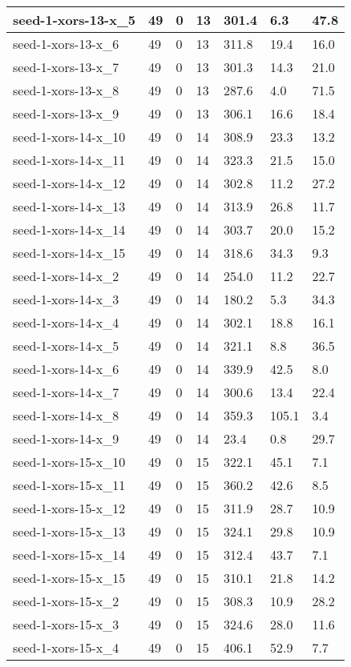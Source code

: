 \begin{scriptsize}
\begin{longtable}{|p{5cm}|l|l|l|l|l|l|}
seed-1-xors-13-x\_5&49&0&13&301.4&6.3&47.8 \\ \hline 
seed-1-xors-13-x\_6&49&0&13&311.8&19.4&16.0 \\ \hline 
seed-1-xors-13-x\_7&49&0&13&301.3&14.3&21.0 \\ \hline 
seed-1-xors-13-x\_8&49&0&13&287.6&4.0&71.5 \\ \hline 
seed-1-xors-13-x\_9&49&0&13&306.1&16.6&18.4 \\ \hline 
seed-1-xors-14-x\_10&49&0&14&308.9&23.3&13.2 \\ \hline 
seed-1-xors-14-x\_11&49&0&14&323.3&21.5&15.0 \\ \hline 
seed-1-xors-14-x\_12&49&0&14&302.8&11.2&27.2 \\ \hline 
seed-1-xors-14-x\_13&49&0&14&313.9&26.8&11.7 \\ \hline 
seed-1-xors-14-x\_14&49&0&14&303.7&20.0&15.2 \\ \hline 
seed-1-xors-14-x\_15&49&0&14&318.6&34.3&9.3 \\ \hline 
seed-1-xors-14-x\_2&49&0&14&254.0&11.2&22.7 \\ \hline 
seed-1-xors-14-x\_3&49&0&14&180.2&5.3&34.3 \\ \hline 
seed-1-xors-14-x\_4&49&0&14&302.1&18.8&16.1 \\ \hline 
seed-1-xors-14-x\_5&49&0&14&321.1&8.8&36.5 \\ \hline 
seed-1-xors-14-x\_6&49&0&14&339.9&42.5&8.0 \\ \hline 
seed-1-xors-14-x\_7&49&0&14&300.6&13.4&22.4 \\ \hline 
seed-1-xors-14-x\_8&49&0&14&359.3&105.1&3.4 \\ \hline 
seed-1-xors-14-x\_9&49&0&14&23.4&0.8&29.7 \\ \hline 
seed-1-xors-15-x\_10&49&0&15&322.1&45.1&7.1 \\ \hline 
seed-1-xors-15-x\_11&49&0&15&360.2&42.6&8.5 \\ \hline 
seed-1-xors-15-x\_12&49&0&15&311.9&28.7&10.9 \\ \hline 
seed-1-xors-15-x\_13&49&0&15&324.1&29.8&10.9 \\ \hline 
seed-1-xors-15-x\_14&49&0&15&312.4&43.7&7.1 \\ \hline 
seed-1-xors-15-x\_15&49&0&15&310.1&21.8&14.2 \\ \hline 
seed-1-xors-15-x\_2&49&0&15&308.3&10.9&28.2 \\ \hline 
seed-1-xors-15-x\_3&49&0&15&324.6&28.0&11.6 \\ \hline 
seed-1-xors-15-x\_4&49&0&15&406.1&52.9&7.7 \\ \hline 

\end{longtable}
\end{scriptsize}
